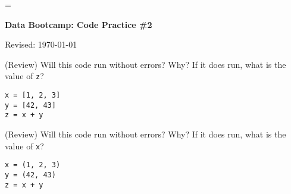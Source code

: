 \documentclass[11pt]{article}
\begin{document}
\parskip=\bigskipamount
\parindent=0.0in
\thispagestyle{empty}


\bigskip\bigskip
\centerline{\Large \bf Data Bootcamp:  Code Practice \#2}
\centerline{Revised: \today}


\item (Review) Will this code run without errors? Why? If it does run, what is the value of \texttt{z}?
\begin{verbatim}
x = [1, 2, 3]
y = [42, 43]
z = x + y
\end{verbatim}


\item (Review) Will this code run without errors? Why? If it does run, what is the value of \texttt{x}?
\begin{verbatim}
x = (1, 2, 3)
y = (42, 43)
z = x + y
\end{verbatim}
\end{document}

